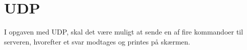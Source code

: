 \chapter{UDP}
I opgaven med UDP, skal det være muligt at sende en af fire kommandoer til serveren, hvorefter et svar modtages og printes på skærmen.
